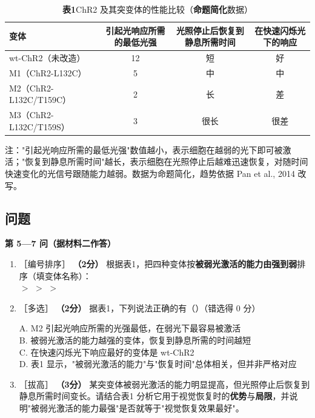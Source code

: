 \documentclass[UTF8,a4paper,11pt]{ctexart}
\newcommand{\pt}[1]{\textbf{（#1分）}}
\newcommand{\lv}[1]{{\small\color{deepgreen}［#1］}}
\newcommand{\key}[1]{\textbf{\color{deepred}#1}}
\newcommand{\tian}[1]{\underline{\hspace{#1}}}
\newcommand{\choice}[1]{\par\smallskip\noindent #1\par}
\begin{document}
\begin{table}[H]
\centering\small
\caption*{\textbf{表1}\quad ChR2 及其突变体的性能比较（\key{命题简化}数据）}
\begin{tabular}{@{}lccc@{}}
\toprule
\textbf{变体} & \textbf{引起光响应所需的最低光强} & \textbf{光照停止后恢复到静息所需时间} & \textbf{在快速闪烁光下的响应} \\
\midrule
wt-ChR2（未改造） & 12 & 短 & 好 \\
M1（ChR2-L132C） & 5 & 中 & 中 \\
M2（ChR2-L132C/T159C） & 2 & 长 & 差 \\
M3（ChR2-L132C/T159S） & 3 & 很长 & 很差 \\
\bottomrule
\end{tabular}

\smallskip
\parbox{0.94\textwidth}{\footnotesize 注："引起光响应所需的最低光强"数值越小，表示细胞在越弱的光下即可被激活；"恢复到静息所需时间"越长，表示细胞在光照停止后越难迅速恢复，对随时间快速变化的光信号跟随能力越弱。数据为命题简化，趋势依据 Pan et al., 2014 改写。}
\end{table}

\subsection*{问题}

\begin{qbox}
\noindent\textbf{\color{deepgreen}第 5—7 问（据材料二作答）}
\begin{enumerate}[leftmargin=2.2em,itemsep=5pt,start=5]
\item \lv{编号排序} \pt{2} 根据表1，把四种变体按\textbf{被弱光激活的能力由强到弱}排序（填变体名称）：\\
\tian{2.4cm} $>$ \tian{2.4cm} $>$ \tian{2.4cm} $>$ \tian{2.4cm}

\item \lv{多选} \pt{2} 据表1，下列说法正确的有（\quad）（错选得 0 分）\\
\choice{A. M2 引起光响应所需的光强最低，在弱光下最容易被激活\\
B. 被弱光激活的能力越强的变体，恢复到静息所需的时间越短\\
C. 在快速闪烁光下响应最好的变体是 wt-ChR2\\
D. 表1 显示，"被弱光激活的能力"与"恢复时间"总体相关，但并非严格对应}

\item \lv{拔高} \pt{3} 某突变体被弱光激活的能力明显提高，但光照停止后恢复到静息所需时间变长。请结合表1 分析它用于视觉恢复时的\textbf{优势}与\textbf{局限}，并说明"被弱光激活的能力最强"是否就等于"视觉恢复效果最好"。
\end{enumerate}
\end{qbox}
\end{document}
